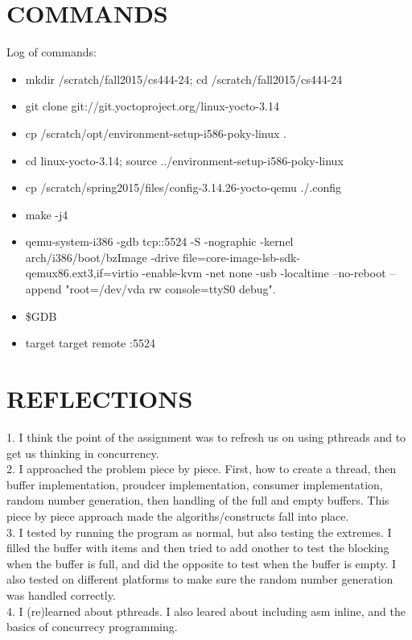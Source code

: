 \documentclass[letterpaper,10pt,titlepage]{article}
\begin{document}
\section{COMMANDS}
Log of commands:\\
    \begin{itemize}
        \item mkdir /scratch/fall2015/cs444-24; cd /scratch/fall2015/cs444-24\\
        \item git clone git://git.yoctoproject.org/linux-yocto-3.14\\
        \item cp /scratch/opt/environment-setup-i586-poky-linux .\\
        \item cd linux-yocto-3.14; source ../environment-setup-i586-poky-linux\\
        \item cp /scratch/spring2015/files/config-3.14.26-yocto-qemu ./.config\\
        \item make -j4\\
        \item qemu-system-i386 -gdb tcp::5524 -S -nographic -kernel arch/i386/boot/bzImage -drive file=core-image-lsb-sdk-qemux86.ext3,if=virtio -enable-kvm -net none -usb -localtime --no-reboot --append "root=/dev/vda rw console=ttyS0 debug".\\
        \item \$GDB
        \item target target remote :5524
    \end{itemize}

\section{REFLECTIONS}
    1. I think the point of the assignment was to refresh us on using pthreads and to get us thinking in concurrency.\\
    2. I approached the problem piece by piece. First, how to create a thread, then buffer implementation, proudcer implementation, consumer implementation, random number generation, then handling of the full and empty buffers. This piece by piece approach made the algoriths/constructs fall into place.\\
    3. I tested by running the program as normal, but also testing the extremes. I filled the buffer with items and then tried to add onother to test the blocking when the buffer is full, and did the opposite to test when the buffer is empty. I also tested on different platforms to make sure the random number generation was handled correctly. \\
    4. I (re)learned about pthreads. I also leared about including asm inline, and the basics of concurrecy programming.\\ 


\end{document}
